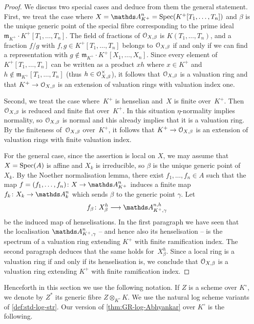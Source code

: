 \begin{proof}
We discuss two special cases and deduce from them the general statement.
First, we treat the case where $X = \bA^n_{K^+} = \Spec (K^+[T_1,\ldots,T_n])$ and $\beta$ is the unique generic point of the special fibre corresponding to the prime ideal $\mathfrak{m}_{K^+}\cdot K^+[T_1,\ldots,T_n]$.
The field of fractions of ${\mathcal O}_{X,\beta}$ is $K(T_1, \dots, T_n)$, and a fraction $f/g$ with $f,g\in K^+[T_1,\dots, T_n]$ belongs to ${\mathcal O}_{X,\beta}$ if and only if we can find a representation with $g\notin \mathfrak{m}_{K^+} \cdot K^+[X_1, \ldots, X_n]$.
Since every element of $K^+[T_1,\ldots,T_n]$ can be written as a product $x h$ where $x\in K^+$ and $h\notin \mathfrak{m}_{K^+}[T_1,\ldots,T_n]$ (thus $h\in {\mathcal O}_{X,\beta}^\times$), it follows that ${\mathcal O}_{X,\beta}$ is a valuation ring and that  $K^+\to {\mathcal O}_{X,\beta}$ is an extension of valuation rings with valuation index one. 

Second, we treat the case where~$K^+$ is henselian and~$X$ is finite over~$K^+$.
Then ${\mathcal O}_{X,\beta}$ is reduced and finite flat over~$K^+$.
In this situation $\eta$-normality implies normality, so ${\mathcal O}_{X,\beta}$ is normal and this already implies that it is a valuation ring.
By the finiteness of~${\mathcal O}_{X,\beta}$ over~$K^+$, it follows that $K^+\to {\mathcal O}_{X,\beta}$ is an extension of valuation rings with finite valuation index.

For the general case, since the assertion is local on $X$, we may assume that $X = \operatorname{Spec}(A)$ is affine and $X_k$ is irreducible, so $\beta$ is the unique generic point of $X_k$.
By the Noether normalisation lemma, there exist $f_1,\dots, f_n\in A$ such that the map $f=(f_1,\dots, f_n)\colon X\to \bA^n_{K^+}$ induces a finite map $f_k\colon X_k\to \bA^n_k$ which sends $\beta$ to the generic point $\gamma$.
Let
\[
    f_\beta \colon X_\beta^h \la \bA_{K^+,\gamma}^{n,h}
\]
be the induced map of henselisations.
In the first paragraph we have seen that the localisation $\bA_{K^+,\gamma}^n$ -- and hence also its henselisation -- is the spectrum of a valuation ring extending $K^+$ with finite ramification index.
The second paragraph deduces that the same holds for~$X_\beta^h$.
Since a local ring is a valuation ring if and only if its henselisation is, we conclude that ${\mathcal O}_{X,\beta}$ is a valuation ring extending $K^+$ with finite ramification index.
\end{proof}

Henceforth in this section we use the following notation. If $Z$ is a scheme over $K^\circ$, we denote by $Z^*$ its generic fibre $Z\otimes_{K^\circ} K$. We use the natural log scheme variants of \cref{def:std-log-str}.  Our version of \cref{thm:GR-log-Abhyankar} over $K^\circ$ is the following.    

